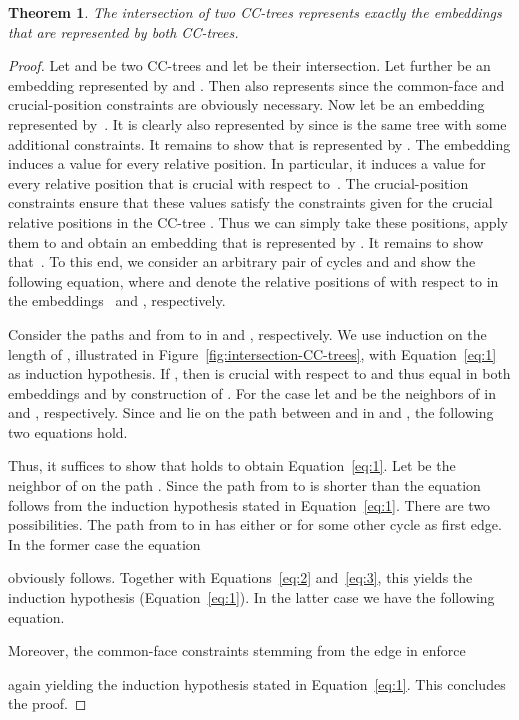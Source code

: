 \documentclass{scrartcl}
\newcommand{\1}[1]{{\normalfont \ensuremath{#1^{\tiny\circled{1}}}}} \newcommand{\2}[1]{{\normalfont \ensuremath{#1^{\tiny\circled{2}}}}} \renewcommand{\k}[1]{{\normalfont \ensuremath{#1^{\tiny\circled{k}}}}} \newcommand{\proj}[2]{\ensuremath{\left.#1\right|_{#2}}} \newcommand{\eps}{\varepsilon}
\theoremstyle{plain} \newtheorem{theorem}{Theorem} \newcounter{lemmacounter} \setcounter{lemmacounter}{0} \newtheorem{lemma}[lemmacounter]{Lemma} \newtheorem{fact}{Fact}  \newtheorem{corollary}{Corollary} \theoremstyle{definition} \newtheorem{definition}{Definition}
\begin{document}
\begin{theorem}
  \label{thm:intersection-is-intersection}
  The intersection of two CC-trees represents exactly the embeddings
  that are represented by both CC-trees.
\end{theorem}
\begin{proof}
  Let  and 
  be two CC-trees and let  be their
  intersection.  Let further  be an embedding represented
  by  and .
  Then  also represents  since
  the common-face and crucial-position constraints are obviously
  necessary.  Now let  be an embedding represented
  by~.  It is clearly also represented by
   since  is the
  same tree with some additional constraints.  It remains to show that
   is represented by .  The
  embedding  induces a value for every relative position.
  In particular, it induces a value for every relative position that
  is crucial with respect to~.  The
  crucial-position constraints ensure that these values satisfy the
  constraints given for the crucial relative positions in the CC-tree
  .  Thus we can simply take these
  positions, apply them to  and obtain an
  embedding  that is represented by .  It remains to show that~.  To this end, we consider an arbitrary pair of
  cycles  and  and show the following equation, where
   and  denote the relative
  positions of  with respect to  in the embeddings~ and , respectively.



  Consider the paths  and  from  to  in
   and ,
  respectively.  We use induction on the length of ,
  illustrated in Figure~\ref{fig:intersection-CC-trees}, with
  Equation~\eqref{eq:1} as induction hypothesis.  If ,
  then  is crucial with respect to  and thus equal in both embeddings 
  and  by construction of .  For the
  case  let  and  be the neighbors of
   in  and , respectively.  Since  and
   lie on the path between  and  in  and , the following two
  equations hold.

Thus, it suffices to show that  holds to obtain Equation~\eqref{eq:1}.  Let
   be the neighbor of  on the path .  Since the
  path from  to  is shorter than  the equation
   follows from the
  induction hypothesis stated in Equation~\eqref{eq:1}.  There are two
  possibilities.  The path from  to  in  has either  or  for
  some other cycle  as first edge.  In the former case the
  equation

obviously follows.  Together with Equations~\eqref{eq:2}
  and~\eqref{eq:3}, this yields the induction hypothesis
  (Equation~\eqref{eq:1}).  In the latter case we have the following
  equation.

Moreover, the common-face constraints stemming from the edge
   in  enforce 

again yielding the induction hypothesis stated in
  Equation~\eqref{eq:1}.  This concludes the proof.
\end{proof}
\end{document}
